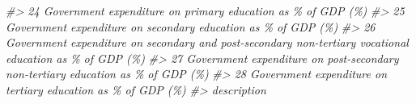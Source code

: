 \documentclass[
  xelatex, ja=standard]{bxjsbook}
\newenvironment{Shaded}{\begin{snugshade}}{\end{snugshade}}
\newcommand{\CommentTok}[1]{\textcolor[rgb]{0.56,0.35,0.01}{\textit{#1}}}
\theoremstyle{definition}
\theoremstyle{definition}
\theoremstyle{definition}
\theoremstyle{definition}
\theoremstyle{remark}
\begin{document}
\begin{Shaded}
\begin{Highlighting}[]
\CommentTok{\#\textgreater{} 24                                              Government expenditure on primary education as \% of GDP (\%)}
\CommentTok{\#\textgreater{} 25                                            Government expenditure on secondary education as \% of GDP (\%)}
\CommentTok{\#\textgreater{} 26 Government expenditure on secondary and post{-}secondary non{-}tertiary vocational education as \% of GDP (\%)}
\CommentTok{\#\textgreater{} 27                          Government expenditure on post{-}secondary non{-}tertiary education as \% of GDP (\%)}
\CommentTok{\#\textgreater{} 28                                             Government expenditure on tertiary education as \% of GDP (\%)}
\CommentTok{\#\textgreater{}                                                                                                                                                                                                                                                                                                                                                                                                                                                                                                                                                                                                                                                                                                                                                                                                                                                                                                                                                                                                                                                                                                                                                                                                                                                                                                                                                                                                                                          description}

\end{Highlighting}
\end{Shaded}
\end{document}
